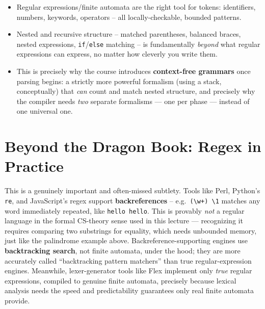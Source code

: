 \documentclass[full-course-notes.tex]{subfiles}
\begin{document}
\begin{takeaways}
\begin{itemize}
  \item Regular expressions/finite automata are the right tool for tokens: identifiers,
  numbers, keywords, operators -- all locally-checkable, bounded patterns.
  \item Nested and recursive structure -- matched parentheses, balanced braces, nested
  expressions, \texttt{if}/\texttt{else} matching -- is fundamentally \emph{beyond} what regular
  expressions can express, no matter how cleverly you write them.
  \item This is precisely why the course introduces \textbf{context-free grammars} once parsing
  begins: a strictly more powerful formalism (using a stack, conceptually) that \emph{can}
  count and match nested structure, and precisely why the compiler needs \emph{two} separate
  formalisms --- one per phase --- instead of one universal one.
\end{itemize}
\end{takeaways}

\section{Beyond the Dragon Book: Regex in Practice}
\label{sec:l4-regex-in-practice}

\begin{enrichment}
This is a genuinely important and often-missed subtlety. Tools like Perl, Python's \texttt{re},
and JavaScript's regex support \textbf{backreferences} -- e.g.\ \texttt{(\textbackslash w+)
\textbackslash1} matches any word immediately repeated, like \texttt{hello hello}. This is
provably \emph{not} a regular language in the formal CS-theory sense used in this lecture ---
recognizing it requires comparing two substrings for equality, which needs unbounded memory,
just like the palindrome example above. Backreference-supporting engines use
\textbf{backtracking search}, not finite automata, under the hood; they are more accurately
called ``backtracking pattern matchers'' than true regular-expression engines. Meanwhile,
lexer-generator tools like Flex implement only \emph{true} regular expressions, compiled to
genuine finite automata, precisely because lexical analysis needs the speed and predictability
guarantees only real finite automata provide.
\end{enrichment}
\end{document}
